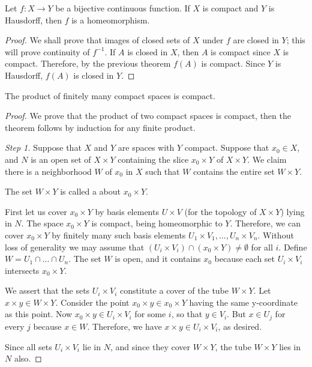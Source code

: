\documentclass[12pt, a4paper, oneside, openright, titlepage]{book}
\begin{document}
\begin{thm}
    Let $f:X\rightarrow Y$ be a bijective continuous function. If $X$ is compact and $Y$ is Hausdorff, then $f$ is a homeomorphism.
\end{thm}
\begin{proof}
    We shall prove that images of closed sets of $X$ under $f$ are closed in $Y$; this will prove continuity of $f^{-1}$. If $A$ is closed in $X$, then $A$ is compact since $X$ is compact. Therefore, by the previous theorem $f(A)$ is compact. Since $Y$ is Hausdorff, $f(A)$ is closed in $Y$.
\end{proof}

\begin{thm}
    The product of finitely many compact spaces is compact.
\end{thm}
\begin{proof}
    We prove that the product of two compact spaces is compact, then the theorem follows by induction for any finite product.

    \emph{Step 1.} Suppose that $X$ and $Y$ are spaces with $Y$ compact. Suppose that $x_0 \in X$, and $N$ is an open set of $X\times Y$ containing the slice $x_0\times Y$ of $X\times Y$.
    We claim there is a neighborhood $W$ of $x_0$ in $X$ such that $W$ contains the entire set $W\times Y$.

    The set $W\times Y$ is called a  about $x_0\times Y$.

    First let us cover $x_0\times Y$ by basis elements $U\times V$ (for the topology of $X\times Y$) lying in $N$. The space $x_0 \times Y$ is compact, being homeomorphic to $Y$. Therefore, we can cover $x_0\times Y$ by finitely many such basis elements $U_1\times V_1,...,U_n\times V_n$. Without loss of generality we may assume that $(U_i\times V_i) \cap (x_0\times Y) \neq \emptyset$ for all $i$. Define $W = U_1\cap ... \cap U_n$. The set $W$ is open, and it contains $x_0$ because each set $U_i\times V_i$ intersects $x_0\times Y$.

    We assert that the sets $U_i\times V_i$ constitute a cover of the tube $W\times Y$. Let $x\times y \in W\times Y$. Consider the point $x_0\times y \in x_0\times Y$ having the same y-coordinate as this point. Now $x_0\times y \in U_i\times V_i$ for some $i$, so that $y \in V_i$. But $x \in U_j$ for every $j$ because $x \in W$. Therefore, we have $x \times y \in U_i\times V_i$, as desired.

    Since all sets $U_i\times V_i$ lie in $N$, and since they cover $W\times Y$, the tube $W\times Y$ lies in $N$ also.


\end{proof}
\end{document}
